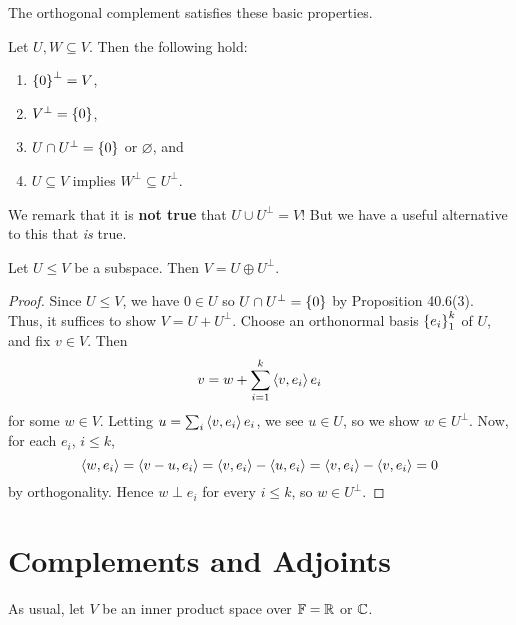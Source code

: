 \documentclass{article}
\begin{document}
The orthogonal complement satisfies these basic properties.
\begin{proposition}
Let $U, W \subseteq V$. Then the following hold:
\begin{enumerate}
    \item $\left\{0\right\}^\perp = V$,
    \item $V^\perp = \left\{0\right\}$,
    \item $U\cap U^\perp =\left\{0\right\}$ or $\varnothing$, and
    \item $U\subseteq V$ implies $W^\perp \subseteq U^\perp$.
\end{enumerate}
\end{proposition}
We remark that it is \textbf{not true} that $U\cup U^\perp = V$! But we have a useful alternative to this that \textit{is} true.

\begin{theorem}
Let $U\leq V$ be a subspace. Then $V = U \oplus U^\perp$.
\end{theorem}
\begin{proof}
Since $U\leq V$, we have $0\in U$ so $U\cap U^\perp = \left\{0\right\}$ by Proposition 40.6(3). Thus, it suffices to show $V = U + U^\perp$. Choose an orthonormal basis $\left\{e_i\right\}_1^k$ of $U$, and fix $v\in V$. Then
$$v = w + \sum_{i=1}^k \left\langle v, e_i\right\rangle e_i$$
for some $w\in V$. Letting $u = \sum_i \left\langle v, e_i\right\rangle e_i$, we see $u\in U$, so we show $w\in U^\perp$. Now, for each $e_i$, $i\leq k$,
$$\left\langle w, e_i\right\rangle = \left\langle v-u, e_i\right\rangle = \left\langle v, e_i\right\rangle - \left\langle u, e_i\right\rangle = \left\langle v, e_i\right\rangle - \left\langle v, e_i\right\rangle = 0$$
by orthogonality. Hence $w\perp e_i$ for every $i\leq k$, so $w\in U^\perp$.
\end{proof}
\section{Complements and Adjoints}
As usual, let $V$ be an inner product space over $\mathbb F = \mathbb R$ or $\mathbb C$.
\end{document}
